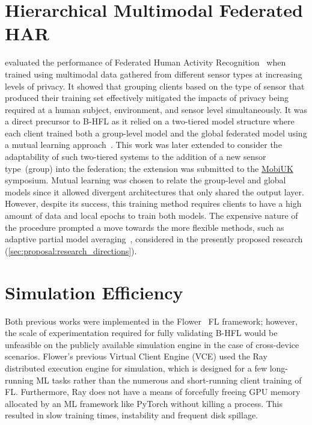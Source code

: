 \section{Hierarchical Multimodal Federated HAR}
\citet{OperaWorkshop} evaluated the performance of Federated Human Activity Recognition~\citep{HARusingFL_2018} when trained using multimodal data gathered from different sensor types at increasing levels of privacy. It showed that grouping clients based on the type of sensor that produced their training set effectively mitigated the impacts of privacy being required at a human subject, environment, and sensor level simultaneously. It was a direct precursor to B-HFL as it relied on a two-tiered model structure where each client trained both a group-level model and the global federated model using a mutual learning approach~\citep{DeepMutualLearning}. This work was later extended to consider the adaptability of such two-tiered systems to the addition of a new sensor type~(group) into the federation; the extension was submitted to the \href{https://mobiuk.org/2023}{MobiUK} symposium. Mutual learning was chosen to relate the group-level and global models since it allowed divergent architectures that only shared the output layer. However, despite its success, this training method requires clients to have a high amount of data and local epochs to train both models. The expensive nature of the procedure prompted a move towards the more flexible methods, such as adaptive partial model averaging~\citep{FedOPT}, considered in the presently proposed research (\cref{sec:proposal:research_directions}).

\section{Simulation Efficiency}
Both previous works were implemented in the Flower~\citep{Flower} FL framework; however, the scale of experimentation required for fully validating B-HFL would be unfeasible on the publicly available simulation engine in the case of cross-device scenarios. Flower's previous Virtual Client Engine (VCE) used the Ray~\citep{RAY} distributed execution engine for simulation, which is designed for a few long-running ML tasks rather than the numerous and short-running client training of FL\@. Furthermore, Ray does not have a means of forcefully freeing GPU memory allocated by an ML framework like PyTorch without killing a process. This resulted in slow training times, instability and frequent disk spillage.


